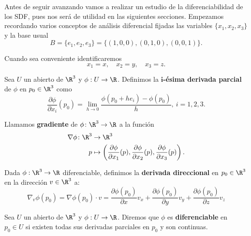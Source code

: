 Antes de seguir avanzando vamos a realizar un estudio de la diferenciabilidad de los SDF, pues nos será de utilidad en las siguientes secciones. Empezamos recordando varios conceptos de análisis diferencial \cite{diff} fijadas las variables $\{x_1,x_2,x_3\}$ y la base usual $$B=\{e_1,e_2,e_3\} = \{(1,0,0),(0,1,0),(0,0,1)\}.$$

Cuando sea conveniente identificaremos
\begin{equation*}
    x_1=x,\quad x_2=y,\quad x_3 = z.
\end{equation*}

\begin{definicion}\label{def:parcial}
    Sea $U$ un abierto de $\R^3$ y $\phi: U \to \R$. Definimos la \textbf{$\boldsymbol{i}$-ésima derivada parcial} de $\phi$ en $p_0\in\R^3$ como
    \begin{equation*}
        \frac{\partial \phi}{\partial x_i}(p_0) = \lim_{h\to 0}\frac{\phi(p_0+he_i) - \phi(p_0)}{h},\ i=1,2,3.
    \end{equation*}
\end{definicion}

\begin{definicion}
  Llamamos \textbf{gradiente} de $\phi\colon \R^3\to\R$ a la función
  \begin{align*}
      \nabla\phi\colon \R^3 &\to \R^3\\
      p &\mapsto \left(\frac{\partial \phi}{\partial x_1}(p), \frac{\partial \phi}{\partial x_2}(p), \frac{\partial \phi}{\partial x_3}(p)\right).
  \end{align*}
\end{definicion}

\begin{definicion}
  Dada $\phi:\R^3\to \R$ diferenciable, definimos la \textbf{derivada direccional} en $p_0\in \R^3$ en la dirección $v\in\R^3$ a:
  \begin{equation*}
    \nabla_v \phi(p_0) = \nabla \phi(p_0) \cdot v = \frac{\partial{\phi}(p_0)}{\partial{x}}v_x + \frac{\partial{\phi}(p_0)}{\partial{y}}v_y + \frac{\partial{\phi}(p_0)}{\partial{z}}v_z
  \end{equation*}
\end{definicion}

\begin{definicion}
    Sea $U$ un abierto de $\R^3$ y $\phi: U \to \R$. Diremos que $\phi$ es \textbf{diferenciable} en $p_0 \in U$ si existen todas sus derivadas parciales en $p_0$ y son continuas.
\end{definicion}


